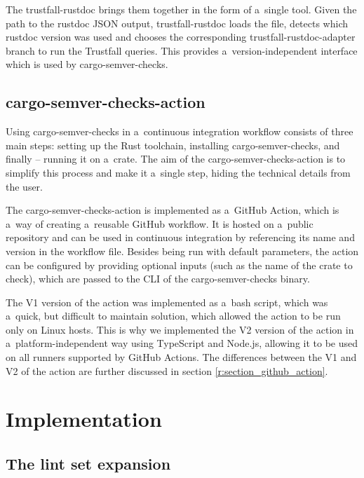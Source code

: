 \documentclass[licencjacka,en]{pracamgr}
\begin{document}
The trustfall-rustdoc brings them together in the form of a~single tool. Given the path to
the rustdoc JSON output, trustfall-rustdoc loads the file, detects which rustdoc version was used
and chooses the corresponding trustfall-rustdoc-adapter branch to run the Trustfall queries.
This provides a~version-independent interface which is used by cargo-semver-checks.

\section{cargo-semver-checks-action}\label{r:section_cargo_semver_checks_action}

Using cargo-semver-checks in a~continuous integration workflow consists of three main steps:
setting up the Rust toolchain, installing cargo-semver-checks, and finally -- running it on a~crate.
The aim of the cargo-semver-checks-action is to simplify this process and make it a~single step,
hiding the technical details from the user.

The cargo-semver-checks-action is implemented as a~GitHub Action, which is a~way of creating
a~reusable GitHub workflow. It is hosted on a~public repository and can be used in continuous
integration by referencing its name and version in the workflow file. Besides being run with default
parameters, the action can be configured by providing optional inputs (such as the name of the crate
to check), which are passed to the CLI of the cargo-semver-checks binary.

The V1 version of the action was implemented as a~bash script, which was a~quick, but difficult
to maintain solution, which allowed the action to be run only on Linux hosts. This is why
we implemented the V2 version of the action in a~platform-independent way using TypeScript
and Node.js, allowing it to be used on all runners supported by GitHub Actions.
The differences between the V1 and V2 of the action are further discussed in section
\ref{r:section_github_action}.


\chapter{Implementation}\label{r:chapter_implementation}

\section{The lint set expansion}\label{r:section_new_lints}
\end{document}
